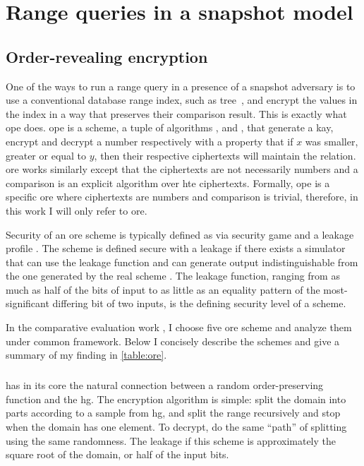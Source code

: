 \chapter{Range queries in a snapshot model}\label{section:range-queries-snapshot}
\thispagestyle{myheadings}

	\section{Order-revealing encryption}

		One of the ways to run a range query in a presence of a snapshot adversary is to use a conventional database range index, such as \BPlus{} tree~\cite{b-tree}, and encrypt the values in the index in a way that preserves their comparison result.
		This is exactly what \gls{ope} does.
		\gls{ope} is a scheme, a tuple of algorithms ,  and , that generate a kay, encrypt and decrypt a number respectively with a property that if $x$ was smaller, greater or equal to $y$, then their respective ciphertexts will maintain the relation.
		\gls{ore} works similarly except that the ciphertexts are not necessarily numbers and a comparison is an explicit algorithm  over hte ciphertexts.
		Formally, \gls{ope} is a specific \gls{ore} where ciphertexts are numbers and comparison is trivial, therefore, in this work I will only refer to \gls{ore}.

		Security of an \gls{ore} scheme is typically defined as via security game and a leakage profile \cite{practical-ore}.
		The scheme is defined secure with a leakage \leakage{} if there exists a simulator that can use the leakage function and can generate output indistinguishable from the one generated by the real scheme \cite{ore-benchmark-17}.
		The leakage function, ranging from as much as half of the bits of input to as little as an equality pattern of the most-significant differing bit of two inputs, is the defining security level of a scheme.

		In the comparative evaluation work \cite{ore-benchmark-17}, I choose five \gls{ore} scheme and analyze them under common framework.
		Below I concisely describe the schemes and give a summary of my finding in \cref{table:ore}.

		\paragraph*{\cite{bclo-ope}} has in its core the natural connection between a random order-preserving function and the \gls{hg}.
		The encryption algorithm is simple: split the domain into parts according to a sample from \gls{hg}, and split the range recursively and stop when the domain has one element.
		To decrypt, do the same ``path'' of splitting using the same randomness.
		The leakage if this scheme is approximately the square root of the domain, or half of the input bits.

